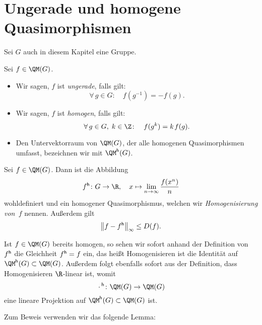 \chapter{Ungerade und homogene Quasimorphismen}
\begin{thSetup}
    Sei $G$ auch in diesem Kapitel eine Gruppe.
\end{thSetup}

\begin{thDef}
    Sei $f\in\QM(G)$.
    \begin{itemize}
        \item
            Wir sagen, $f$ ist \emph{ungerade}, falls gilt:
            \[ \forall\,g\in G\colon\quad
                f(g^{-1}) = -f(g)
            . \]
            
        \item
            Wir sagen, $f$ ist \emph{homogen}, falls gilt:
            \[ \forall\,g\in G,\;k\in\Z\colon\quad
                f(g^k) = k \mkern2mu f(g)
            . \]
            
        \item
            Den Untervektorraum von $\QM(G)$, der alle homogenen Quasimorphismen
            umfasst, bezeichnen wir mit $\QM\homo(G)$.
    \end{itemize}
\end{thDef}

\begin{thProposition}[Homogenisierung]
    \label{homo:homo}%
    Sei $f\in\QM(G)$. Dann ist die Abbildung
    \[ f\homo \colon G \to \R, \quad
        x\mapsto \lim_{n\to\infty} \frac{f(x^n)}{n}
    \]
    wohldefiniert und ein homogener Quasimorphismus, welchen wir
    \emph{Homogenisierung von~$f$} nennen. Außerdem gilt
    \[ \norm[\big]{f-f\homo}_\supr \leq D(f)  . \]
\end{thProposition}

\begin{thBemerkung} \label{homo:homoisproj}
    Ist $f\in\QM(G)$ bereits homogen, so sehen wir sofort anhand der Definition
    von $f\homo$ die Gleichheit $f\homo = f$ ein, das heißt Homogenisieren ist die
    Identität auf $\QM\homo(G) \subset \QM(G)$. Außerdem folgt ebenfalls sofort
    aus der Definition, dass Homogenisieren $\R$-linear ist, womit
    \[ {\scdot}\homo\colon \QM(G) \to \QM(G) \]
    eine lineare Projektion auf $\QM\homo(G) \subset \QM(G)$ ist.
\end{thBemerkung}

Zum Beweis verwenden wir das folgende Lemma:

